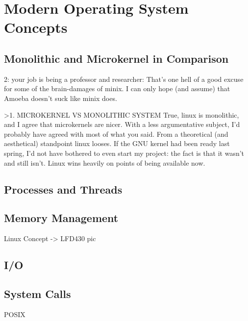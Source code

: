 
\chapter{Modern Operating System Concepts} \label{ch:modern-os-concepts}


\section{Monolithic and Microkernel in Comparison} \label{sec:monolith-vs-microkernel}


 2: your job is being a professor and researcher: That's one hell of a
good excuse for some of the brain-damages of minix. I can only hope (and
assume) that Amoeba doesn't suck like minix does.

>1. MICROKERNEL VS MONOLITHIC SYSTEM
True, linux is monolithic, and I agree that microkernels are nicer. With
a less argumentative subject, I'd probably have agreed with most of what
you said. From a theoretical (and aesthetical) standpoint linux looses.
If the GNU kernel had been ready last spring, I'd not have bothered to
even start my project: the fact is that it wasn't and still isn't. Linux
wins heavily on points of being available now.




\section{Processes and Threads} %

\section{Memory Management} %
    Linux Concept -> LFD430 pic

\section{I/O} %

\section{System Calls} %
    POSIX
